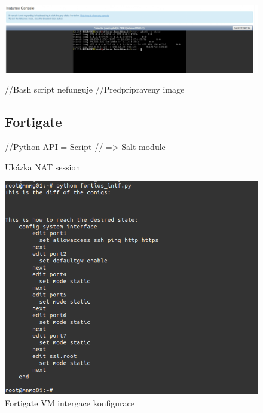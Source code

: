 \begin{figure}[h]
\begin{centering}
\includegraphics[scale=0.45]{images/pfsense_nat}
\par\end{centering}
\caption{Ukázka NAT session\label{fig:pfsense_nat}}

//Bash script nefunguje
//Predpripraveny image

\subsection{Fortigate}

//Python API = Script
// => Salt module 
\end{figure}

\begin{figure}[h]
\begin{centering}
\includegraphics[scale=0.45]{images/fortigate_int}
\par\end{centering}
\caption{Fortigate VM intergace konfigurace\label{fig:fortigate_int}}
\end{figure}


